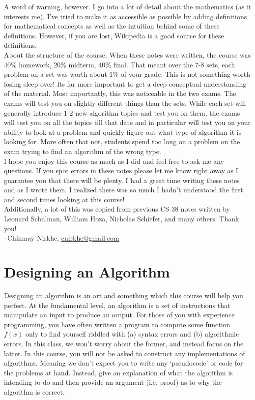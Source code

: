 \documentclass[10pt]{article}
\theoremstyle{plain}
\theoremstyle{definition}
\numberwithin{equation}{section}
\numberwithin{figure}{section}
\begin{document}
\noindent A word of warning, however. I go into a lot of detail about the mathematics (as it interests me). I've tried to make it as accessible as possible by adding definitions for mathematical concepts as well as the intuition behind some of these definitions. However, if you are lost, Wikipedia is a good source for these definitions. \\

\noindent About the structure of the course. When these notes were written, the course was 40\% homework, 20\% midterm, 40\% final. That meant over the 7-8 sets, each problem on a set was worth about 1\% of your grade. This is not something worth losing sleep over! Its far more important to get a deep conceptual understanding of the material. Most importantly, this was noticeable in the two exams. The exams will test you on slightly different things than the sets. While each set will generally introduce 1-2 new algorithm topics and test you on them, the exams will test you on all the topics till that date and in particular will test you on your ability to look at a problem and quickly figure out what type of algorithm it is looking for. More often that not, students spend too long on a problem on the exam trying to find an algorithm of the wrong type. \\

\noindent I hope you enjoy this course as much as I did and feel free to ask me any questions. If you spot errors in these notes please let me know right away as I guarantee you that there will be plenty. I had a great time writing these notes and as I wrote them, I realized there was so much I hadn't understood the first and second times looking at this course! \\

\noindent Additionally, a lot of this was copied from previous CS 38 notes written by Leonard Schulman, William Hoza, Nicholas Schiefer, and many others. Thank you! \\

\noindent --Chinmay Nirkhe, \href{mailto:cnirkhe@gmail.com}{cnirkhe@gmail.com}


\newpage

\section{Designing an Algorithm}

\noindent Designing an algorithm is an art and something which this course will help you perfect. At the fundamental level, an algorithm is a set of instructions that manipulate an input to produce an output. For those of you with experience programming, you have often written a program to compute some function $f(x)$ only to find yourself riddled with (a) syntax errors and (b) algorithmic errors. In this class, we won't worry about the former, and instead focus on the latter. In this course, you will not be asked to construct any implementations of algorithms. Meaning we don't expect you to write any `pseudocode' or code for the problems at hand. Instead, give an explanation of what the algorithm is intending to do and then provide an argument (i.e. proof) as to why the algorithm is correct. \\
\end{document}
